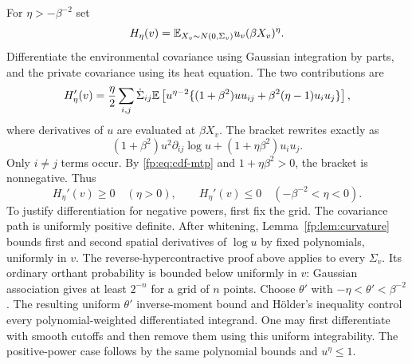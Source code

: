 For $\eta>-\beta^{-2}$ set
\[
 H_\eta(v)=\mathbb E_{X_v\sim N(0,\Sigma_v)}u_v(\beta X_v)^\eta.
\]
Differentiate the environmental covariance using Gaussian integration by parts, and the private covariance using its heat equation. The two contributions are
\begin{equation}\label{fp:eq:interpolation}
 H_\eta'(v)
 =\frac\eta2\sum_{i,j}\dot\Sigma_{ij}
 \mathbb E\left[u^{\eta-2}
 \{(1+\beta^2)u u_{ij}+\beta^2(\eta-1)u_i u_j\}\right],
\end{equation}
where derivatives of $u$ are evaluated at $\beta X_v$. The bracket rewrites exactly as
\begin{equation}\label{fp:eq:interpolation-positive}
 (1+\beta^2)u^2\partial_{ij}\log u
 +(1+\eta\beta^2)u_i u_j.
\end{equation}
Only $i\ne j$ terms occur. By \eqref{fp:eq:cdf-mtp} and $1+\eta\beta^2>0$, the bracket is nonnegative. Thus
\begin{equation}\label{fp:eq:interpolation-sign}
 H_\eta'(v)\ge0\quad(\eta>0),\qquad
 H_\eta'(v)\le0\quad(-\beta^{-2}<\eta<0).
\end{equation}
To justify differentiation for negative powers, first fix the grid.
The covariance path is uniformly positive definite. After whitening,
Lemma~\ref{fp:lem:curvature} bounds first and second spatial derivatives
of $\log u$ by fixed polynomials, uniformly in $v$. The
reverse-hypercontractive proof above applies to every $\Sigma_v$.
Its ordinary orthant probability is bounded below uniformly in $v$:
Gaussian association gives at least $2^{-n}$ for a grid of $n$ points.
Choose $\theta'$ with $-\eta<\theta'<\beta^{-2}$. The resulting
uniform $\theta'$ inverse-moment bound and H\"older's inequality
control every polynomial-weighted differentiated integrand.
One may first differentiate with smooth cutoffs and then remove them
using this uniform integrability. The positive-power case follows by
the same polynomial bounds and $u^\eta\le1$.

